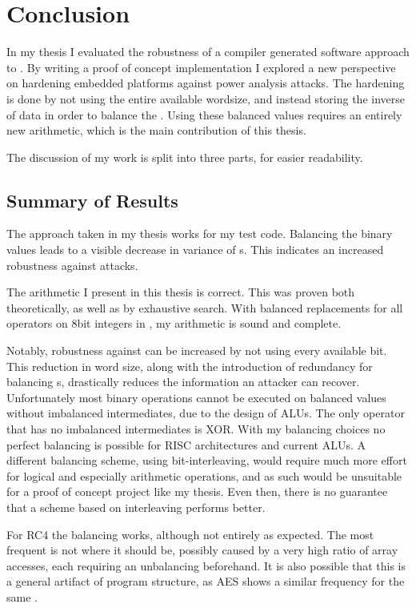 \chapter{Conclusion}
\label{conclusion}
In my thesis I evaluated the robustness of a compiler generated software approach to \dual{}.
By writing a proof of concept implementation I explored a new perspective on hardening embedded platforms against power analysis attacks.
The hardening is done by not using the entire available wordsize, and instead storing the inverse of data in order to balance the \hammingw{}.
Using these balanced values requires an entirely new arithmetic, which is the main contribution of this thesis.

The discussion of my work is split into three parts, for easier readability.

\section{Summary of Results}
The approach taken in my thesis works for my test code.
Balancing the binary values leads to a visible decrease in variance of \hammingw{}s.
This indicates an increased robustness against \poweranalysis{} attacks.

The arithmetic I present in this thesis is correct.
This was proven both theoretically, as well as by exhaustive search.
With balanced replacements for all operators on 8bit integers in \ir{}, my arithmetic is sound and complete.

Notably, robustness against \poweranalysis{} can be increased by not using every available bit.
This reduction in word size, along with the introduction of redundancy for balancing \hammingw{}s, drastically reduces the information an attacker can recover.
Unfortunately most binary operations cannot be executed on balanced values without imbalanced intermediates, due to the design of ALUs.
The only operator that has no imbalanced intermediates is XOR.
With my balancing choices no perfect balancing is possible for RISC architectures and current ALUs.
A different balancing scheme, using bit-interleaving, would require much more effort for logical and especially arithmetic operations, and as such would be unsuitable for a proof of concept project like my thesis.
Even then, there is no guarantee that a scheme based on interleaving performs better.

For RC4 the balancing works, although not entirely as expected.
The most frequent \hammingw{} is not where it should be, possibly caused by a very high ratio of array accesses, each requiring an unbalancing beforehand.
It is also possible that this is a general artifact of program structure, as AES shows a similar frequency for the same \hammingw{}.

